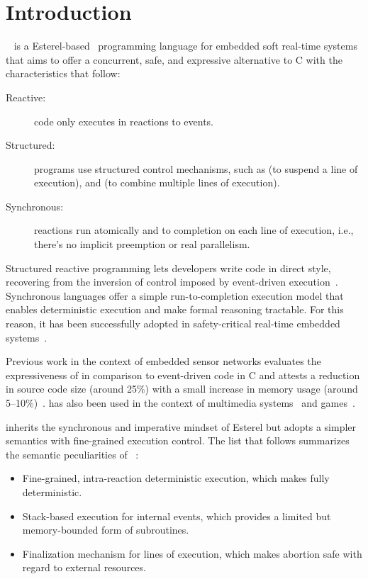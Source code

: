 \section{Introduction}
\label{sec.intro}

\CEU~\cite{ceu.sensys13,ceu.tecs17} is a Esterel-based~\cite{esterel.ieee91}
programming language for embedded soft real-time systems that aims to offer a
concurrent, safe, and expressive alternative to C with the characteristics that
follow:
%
\begin{description}
\item [Reactive:] code only executes in reactions to events.
\item [Structured:] programs use structured control mechanisms, such as
     (to suspend a line of execution), and  (to combine
    multiple lines of execution).
\item [Synchronous:] reactions run atomically and to completion on each line of
    execution, i.e., there's no implicit preemption or real parallelism.
\end{description}
%
Structured reactive programming lets developers write code in direct style,
recovering from the inversion of control imposed by event-driven
execution~\cite{rp.deprecating,rp.rescala,sync_async.cooperative}.
%
Synchronous languages offer a simple run-to-completion execution model that
enables deterministic execution and make formal reasoning tractable.
For this reason, it has been successfully adopted in safety-critical real-time
embedded systems~\cite{rp.twelve}.

Previous work in the context of embedded sensor networks evaluates the
expressiveness of \CEU in comparison to event-driven code in C and attests a
reduction in source code size (around 25\%) with a small increase in memory
usage (around 5--10\%)~\cite{ceu.sensys13}.
%
\CEU has also been used in the context of multimedia
systems~\cite{ceumedia.webmedia16} and games~\cite{ceu.mod15}.

\CEU inherits the synchronous and imperative mindset of Esterel but adopts a
simpler semantics with fine-grained execution control.
%
The list that follows summarizes the semantic peculiarities of
\CEU~\cite{ceu.tecs17}:
%
\begin{itemize}
    \item Fine-grained, intra-reaction deterministic execution, which makes
          \CEU fully deterministic.
    \item Stack-based execution for internal events, which provides a limited
          but memory-bounded form of subroutines.
    \item Finalization mechanism for lines of execution, which makes abortion
          safe with regard to external resources.
\end{itemize}

